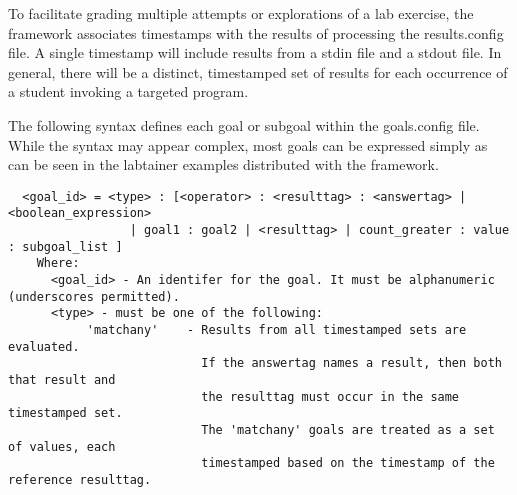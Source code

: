 \documentclass{article}
\begin{document}
To facilitate grading multiple attempts or explorations of a lab exercise, the framework associates
timestamps with the results of processing the results.config file.  A single timestamp will
include results from a stdin file and a stdout file.  In general, there will be a distinct, 
timestamped set of results for each occurrence of a student invoking a targeted program.

The following syntax defines each goal or subgoal within the goals.config file.  While the syntax
may appear complex, most goals can be expressed simply as can be seen in the labtainer examples distributed
with the framework.

\begin{verbatim}
  <goal_id> = <type> : [<operator> : <resulttag> : <answertag> | <boolean_expression> 
                 | goal1 : goal2 | <resulttag> | count_greater : value : subgoal_list ]
    Where: 
      <goal_id> - An identifer for the goal. It must be alphanumeric (underscores permitted).
      <type> - must be one of the following:
           'matchany'    - Results from all timestamped sets are evaluated.
                           If the answertag names a result, then both that result and
                           the resulttag must occur in the same timestamped set.
                           The 'matchany' goals are treated as a set of values, each 
                           timestamped based on the timestamp of the reference resulttag.
                        

\end{verbatim}
\end{document}
